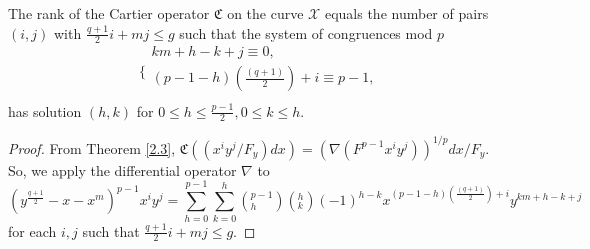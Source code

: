  \begin{proposition}\label{111}
   The rank of the Cartier operator $\mathfrak{C}$ on the curve $\mathcal{X}$ equals the number of pairs $(i, j)$ with $\frac{q+1}{2}i+ mj \leq g$ such that the system of congruences mod $p$
\begin{equation}\label{12}
\Bigg\{
             \begin{array}{c}
              km + h - k + j \equiv 0,\\
              (p - 1 - h)(\frac{(q+1)}{2}) + i \equiv p-1, \\
             \end{array}
\end{equation}
has solution $(h, k)$ for $0 \leq h \leq \frac{p-1}{2}, 0 \leq k\leq h$.
 \end{proposition}
\begin{proof}
From Theorem \ref{2.3}, $\mathfrak{C}((x^iy^j/F_y)dx) =(\nabla(F^{p-1}x^iy^j))^{1/p}dx/F_y$. So, we apply the differential operator $\nabla$ to
\begin{equation}\label{333}
  (y^{\frac{q+1}{2}}-x-x^{m})^{p-1}x^iy^j = \sum_{h=0}^{p-1}\sum_{k=0}^{h} (^{p-1}_h)(^{h}_{k})(-1)^{h-k}x^{ (p - 1 - h)(\frac{(q+1)}{2}) + i}y^{km + h - k + j}
\end{equation}
for each $i, j$ such that $\frac{q+1}{2}i+ mj \leq g$.



\end{proof}
